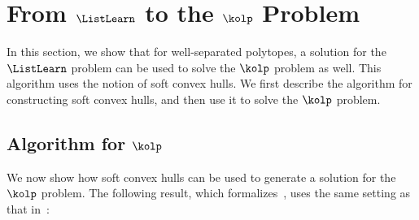 \section{From $\ListLearn$ to the  $\kolp$ Problem}
\label{sec:kolp}

In this section, we show that for well-separated polytopes, a solution for the $\ListLearn$ problem can be used to solve the $\kolp$ problem as well. This algorithm uses the notion of soft convex hulls. 
We first describe the algorithm for constructing soft convex hulls, and then use it to solve the $\kolp$ problem. 


\subsection{Algorithm for $\kolp$}
We now show how soft convex hulls can be used to generate a solution for the $\kolp$ problem. The following result, which formalizes~, uses the same setting as that in~:

